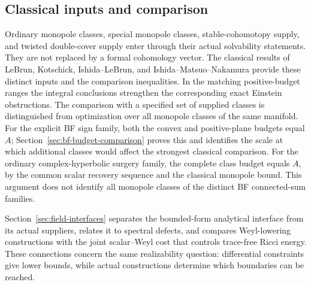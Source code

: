 \documentclass[10pt,a4paper]{article}
\theoremstyle{definition}
\theoremstyle{remark}
\numberwithin{equation}{section}
\begin{document}
\subsection{Classical inputs and comparison}
Ordinary monopole classes, special monopole classes, stable-cohomotopy
supply, and twisted double-cover supply enter through their actual
solvability statements. They are not replaced by a formal cohomology
vector. The classical results of LeBrun, Kotschick, Ishida--LeBrun, and
Ishida--Matsuo--Nakamura provide these distinct inputs and the comparison
inequalities. In the matching positive-budget ranges the integral
conclusions strengthen the corresponding exact Einstein obstructions.
The comparison with a specified set of supplied classes is distinguished
from optimization over all monopole classes of the same manifold.
For the explicit BF sign family, both the convex and positive-plane
budgets equal $A$; Section~\ref{sec:bf-budget-comparison} proves this
and identifies the scale at which additional classes would affect
the strongest classical comparison.
For the ordinary complex-hyperbolic surgery family, the complete class
budget equals $A$, by the common scalar recovery sequence and the
classical monopole bound. This argument does not identify all monopole
classes of the distinct BF connected-sum families.

Section~\ref{sec:field-interfaces} separates the bounded-form analytical
interface from its actual suppliers, relates it to spectral defects, and
compares Weyl-lowering constructions with the joint scalar--Weyl cost
that controls trace-free Ricci energy. These connections concern the
same realizability question: differential constraints give lower bounds,
while actual constructions determine which boundaries can be reached.
\end{document}
